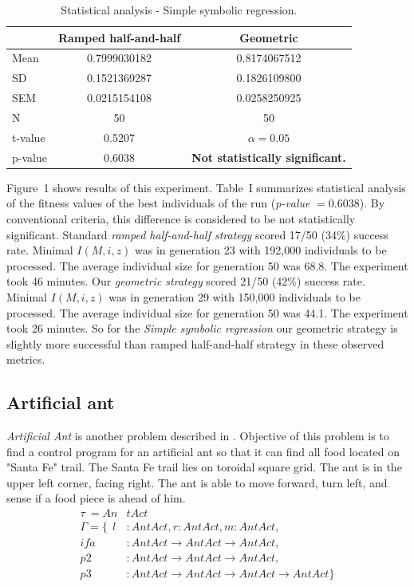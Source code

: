 \documentclass[conference]{IEEEtran}
\newcommand{\ar}{\rightarrow\xspace}
\begin{document}
\begin{table}[t]
\centering
\begin{tabular}{|l|cc|}
\hline
& Ramped half-and-half & Geometric \\
\hline
Mean & 0.7999030182 & 0.8174067512 \\
SD	 & 0.1521369287	& 0.1826109800 \\
SEM	 & 0.0215154108	& 0.0258250925 \\
N	 & 50 & 50  \\
\hline
t-value & 0.5207 & $\alpha = 0.05$\\
p-value & 0.6038 & \textbf{Not statistically significant.}\\
\hline
\end{tabular}
\caption{Statistical analysis - Simple symbolic regression.}
\end{table}

Figure~1 shows results of this experiment. 
Table~I summarizes statistical analysis
of the fitness values of the best individuals of the run 
(\textit{p-value} $ = 0.6038$).  
By conventional criteria, this difference is considered to be not statistically significant.
Standard \textit{ramped half-and-half strategy} scored 17/50 (34\%) success rate. 
Minimal $I(M,i,z)$ was in generation 23 with 192,000 individuals to be processed.
The average individual size for generation 50 was 68.8.
The experiment took 46 minutes.
Our \textit{geometric strategy} scored 21/50 (42\%) success rate. 
Minimal $I(M,i,z)$ was in generation 29 with 150,000 individuals to be processed.
The average individual size for generation 50 was 44.1.
The experiment took 26 minutes.
So for the \textit{Simple symbolic regression}
our geometric strategy is slightly more successful than 
ramped half-and-half strategy in these observed metrics.



\subsection{Artificial ant}
\textit{Artificial Ant} is another problem described
in \cite{koza92}. Objective of this problem is to 
find a control program for an artificial ant so
that it can find all food located on "Santa Fe" trail.
The Santa Fe trail lies on toroidal square grid.
The ant is in the upper left corner, facing right.
The ant is able to move forward, turn left, and sense if a food 
piece is ahead of him.
\begin{align*}
\tau~ = An&tAct\\
\Gamma = \{~~
  l    &: AntAct                              ,
  r    : AntAct                               ,
  m    : AntAct                               ,\\
  ifa  &: AntAct \ar AntAct \ar AntAct  ,\\
  p2   &: AntAct \ar AntAct \ar AntAct  ,\\
  p3   &: AntAct \ar AntAct \ar AntAct \ar AntAct  \}
\end{align*}
\end{document}
